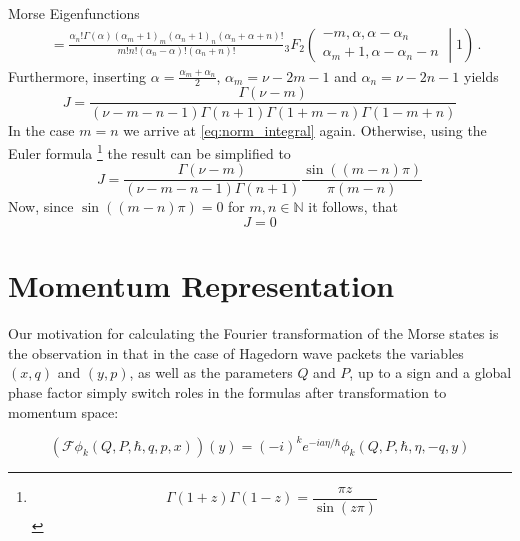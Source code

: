 \begin{chapter}{Morse Eigenfunctions}
\begin{equation*}
\begin{split}
	& =
	\frac{\alpha_{n}! \Gamma(\alpha) \left(\alpha_{m}+1\right)_{m} \left(\alpha_{n}+1\right)_{n} (\alpha_{n}+\alpha+n)!}
	     {m! n! (\alpha_n-\alpha)! (\alpha_n+n)!}
	{}_{3}F_{2}
	\left(
	  \begin{matrix}
	    -m, \alpha, \alpha-\alpha_{n} \\
	    \alpha_{m}+1, \alpha-\alpha_{n}-n
	  \end{matrix}
	  \middle| {1} \right) \,.
      \end{split}
    \end{equation*}
    Furthermore, inserting $\alpha = \frac{\alpha_{m} + \alpha_{n}}{2}$,
    $\alpha_{m} = \nu - 2m -1$ and $\alpha_{n} = \nu -2n -1$ yields
    \begin{equation}
      J = \frac{\Gamma(\nu-m)}{(\nu-m-n-1) \Gamma(n+1) \Gamma(1+m-n) \Gamma(1-m+n)}
    \end{equation}
    In the case $m = n$ we arrive at \eqref{eq:norm_integral} again.
    Otherwise, using the Euler formula
    \footnote{
      \begin{equation}
	\Gamma(1 + z) \Gamma(1 - z) = \frac{\pi z}{\sin(z \pi)}
      \end{equation}
    }
    the result can be simplified to
    \begin{equation}
      J = \frac{\Gamma(\nu-m)}{(\nu-m-n-1) \Gamma(n+1)}\frac{\sin((m-n)\pi)}{\pi (m-n)}
    \end{equation}
    Now, since  $\sin((m-n)\pi) = 0$ for $m, n \in \mathbb{N}$ it follows, that
    \begin{equation}
      J = 0
    \end{equation}


    \section{Momentum Representation} %
    \label{sec: Momentum Representation}
    Our motivation for calculating the Fourier transformation of the Morse states is the observation in \cite{H_ladder_operators} that in the case of Hagedorn wave packets 
    the variables $(x, q)$ and $(y,p)$, as well as the parameters $Q$ and $P$, up to a sign and a global phase factor simply switch roles in the
    formulas after transformation to momentum space:

\begin{equation}
    \label{eq:HGWavepacketFourier}
    (\mathcal{F}\phi_k(Q, P, \hbar, q, p, x))(y)=(-i)^ke^{-ia\eta/\hbar}\phi_k(Q, P, \hbar, \eta, -q, y)
\end{equation}


\end{chapter}
